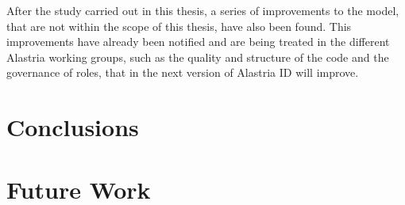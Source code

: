 \documentclass[a4paper, 12pt]{article} %
\begin{document}
        After the study carried out in this thesis, a series of improvements to the model, that are not within the scope of this thesis, have also been found. This improvements have already been notified and are being treated in the different Alastria working groups, such as the quality and structure of the code and the governance of roles, that in the next version of Alastria ID will improve.
        
\newpage
\section{Conclusions}

\newpage
\section{Future Work}
\newpage
\printbibliography[heading=bibnumbered] %
\end{document}
